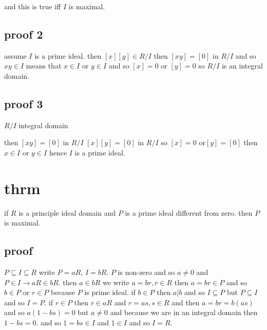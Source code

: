 \documentclass[letterpaper]{article}
\begin{document}
and this is true iff $I$ is maximal.

\subsection*{proof 2}
assume $I$ is a prime ideal. then $[x][y]\in R/I$ then $[xy]=[0]$  in $R/I$ and so $xy\in I$ means that $x\in I$ or $y\in I$ and so $[x]=0$ or $[y]=0$ so $R/I$ is an integral domain.

\subsection*{proof 3}
$R/I$ integral domain

then $[xy]=[0]$ in $R/I$ $[x][y]=[0]$ in $R/I$ so $[x]=0$ or$[y]=[0]$ then $x\in I$ or $y\in I$ hence $I$ is a prime ideal.

\section*{thrm}
if $R$ is a principle ideal domain and $P$ is a prime ideal different from zero. then $P$ is maximal.

\subsection*{proof}
$P\subseteq I\subseteq R$ write $P=aR$, $I=bR$. $P$ is non-zero and so $a\ne 0$ and $P\in I\to aR\in bR$. then $a\in bR$ we write $a=br, r\in R$ then $a=br\in P$ and so  $b\in P$ or $r\in P$ because $P$ is prime ideal. if $b\in P$ then $a|b$ and so $I\subseteq P$ but $P\subseteq I$ and so $I=P$. if $r\in P$ then $r\in aR$ and $r=as, s\in R$ and then $a=br=b(as)$ and so $a(1-bs)=0$ but $a\ne 0$ and because we are in an integral domain then $1-bs=0$. and so $1=bs\in I$ and $1\in I$ and so $I=R$.
\end{document}
